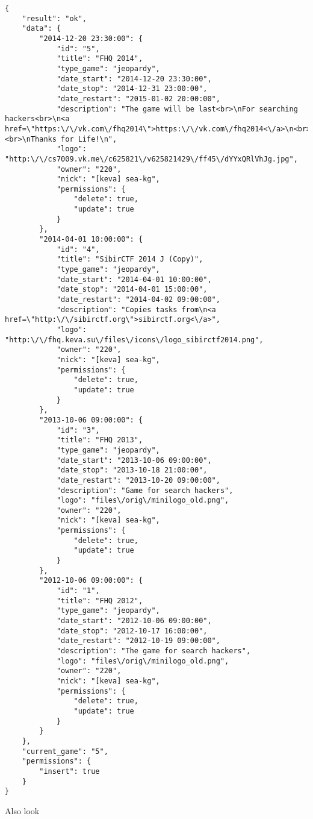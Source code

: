 \begin{Verbatim}[frame=single]
{
    "result": "ok",
    "data": {
        "2014-12-20 23:30:00": {
            "id": "5",
            "title": "FHQ 2014",
            "type_game": "jeopardy",
            "date_start": "2014-12-20 23:30:00",
            "date_stop": "2014-12-31 23:00:00",
            "date_restart": "2015-01-02 20:00:00",
            "description": "The game will be last<br>\nFor searching hackers<br>\n<a href=\"https:\/\/vk.com\/fhq2014\">https:\/\/vk.com\/fhq2014<\/a>\n<br><br>\nThanks for Life!\n",
            "logo": "http:\/\/cs7009.vk.me\/c625821\/v625821429\/ff45\/dYYxQRlVhJg.jpg",
            "owner": "220",
            "nick": "[keva] sea-kg",
            "permissions": {
                "delete": true,
                "update": true
            }
        },
        "2014-04-01 10:00:00": {
            "id": "4",
            "title": "SibirCTF 2014 J (Copy)",
            "type_game": "jeopardy",
            "date_start": "2014-04-01 10:00:00",
            "date_stop": "2014-04-01 15:00:00",
            "date_restart": "2014-04-02 09:00:00",
            "description": "Copies tasks from\n<a href=\"http:\/\/sibirctf.org\">sibirctf.org<\/a>",
            "logo": "http:\/\/fhq.keva.su\/files\/icons\/logo_sibirctf2014.png",
            "owner": "220",
            "nick": "[keva] sea-kg",
            "permissions": {
                "delete": true,
                "update": true
            }
        },
        "2013-10-06 09:00:00": {
            "id": "3",
            "title": "FHQ 2013",
            "type_game": "jeopardy",
            "date_start": "2013-10-06 09:00:00",
            "date_stop": "2013-10-18 21:00:00",
            "date_restart": "2013-10-20 09:00:00",
            "description": "Game for search hackers",
            "logo": "files\/orig\/minilogo_old.png",
            "owner": "220",
            "nick": "[keva] sea-kg",
            "permissions": {
                "delete": true,
                "update": true
            }
        },
        "2012-10-06 09:00:00": {
            "id": "1",
            "title": "FHQ 2012",
            "type_game": "jeopardy",
            "date_start": "2012-10-06 09:00:00",
            "date_stop": "2012-10-17 16:00:00",
            "date_restart": "2012-10-19 09:00:00",
            "description": "The game for search hackers",
            "logo": "files\/orig\/minilogo_old.png",
            "owner": "220",
            "nick": "[keva] sea-kg",
            "permissions": {
                "delete": true,
                "update": true
            }
        }
    },
    "current_game": "5",
    "permissions": {
        "insert": true
    }
}
\end{Verbatim}


Also look ~

